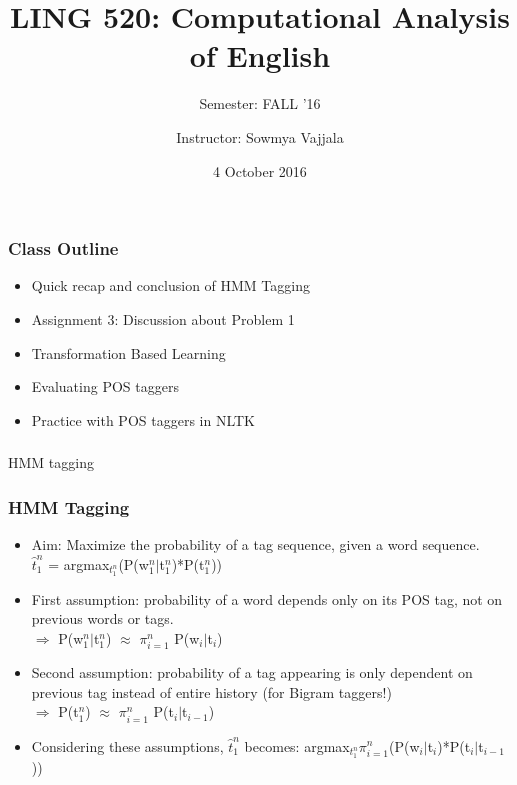 \documentclass{beamer}
\author[Sowmya Vajjala]{Instructor: Sowmya Vajjala}
\title[LING 520]{LING 520: Computational Analysis of English}
\subtitle{Semester: FALL '16}
\date{4 October 2016}
\institute{Iowa State University, USA}
\begin{document}
\begin{frame}\titlepage
\end{frame}

\begin{frame}
\frametitle{Class Outline}
\begin{itemize}
\item Quick recap and conclusion of HMM Tagging
\item Assignment 3: Discussion about Problem 1
\item Transformation Based Learning
\item Evaluating POS taggers
\item Practice with POS taggers in NLTK
\end{itemize}
\end{frame}

\begin{frame}
\frametitle{}
\begin{center}
\Large HMM tagging
\end{center}
\end{frame}

\begin{frame}
\frametitle{HMM Tagging}
\begin{itemize}
\item Aim: Maximize the probability of a tag sequence, given a word sequence.
\\ $\hat t_1^n$ = argmax$_{t_1^n}$(P(w$_1^n|$t$_1^n$)*P(t$_1^n$))
\item First assumption: probability of a word depends only on its POS tag, not on previous words or tags.
\\ $\Rightarrow$ \small{P(w$_1^n|$t$_1^n$)} \normalsize $\approx$ $\pi_{i=1}^n$ \small{P(w$_i|$t$_i$)} \normalsize
\item Second assumption: probability of a tag appearing is only dependent on previous tag instead of entire history (for Bigram taggers!)
\\ $\Rightarrow$ \small{P(t$_1^n$)} \normalsize $\approx$ $\pi_{i=1}^n$ \small{P(t$_i|$t$_{i-1}$)} \normalsize
\item Considering these assumptions, $\hat t_1^n$ becomes: argmax$_{t_1^n} \pi_{i=1}^n$(P(w$_i|$t$_i$)*P(t$_i|$t$_{i-1}$))
\end{itemize}
\end{frame}
\end{document}
